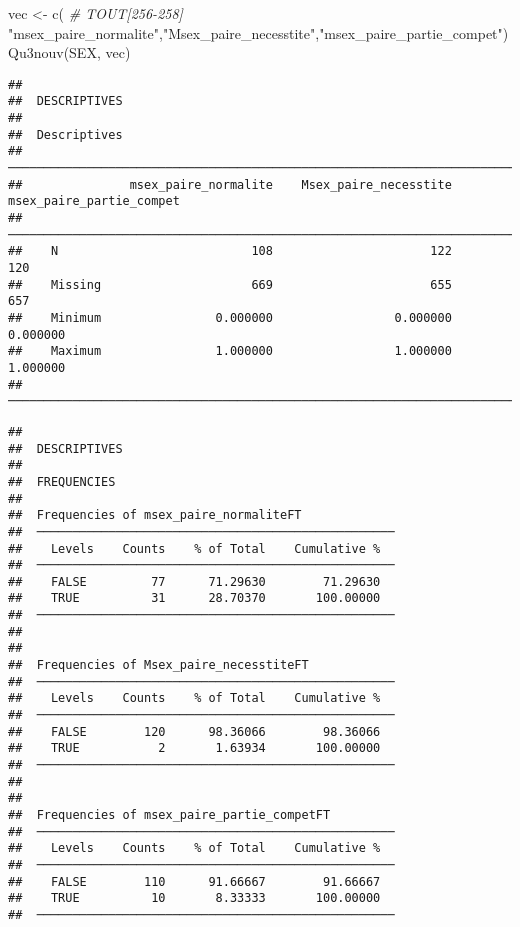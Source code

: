 \documentclass[
]{article}
\newenvironment{Shaded}{\begin{snugshade}}{\end{snugshade}}
\newcommand{\CommentTok}[1]{\textcolor[rgb]{0.56,0.35,0.01}{\textit{#1}}}
\newcommand{\FunctionTok}[1]{\textcolor[rgb]{0.00,0.00,0.00}{#1}}
\newcommand{\NormalTok}[1]{#1}
\newcommand{\OtherTok}[1]{\textcolor[rgb]{0.56,0.35,0.01}{#1}}
\newcommand{\StringTok}[1]{\textcolor[rgb]{0.31,0.60,0.02}{#1}}
\begin{document}
\begin{Shaded}
\begin{Highlighting}[]
\NormalTok{vec }\OtherTok{\textless{}{-}} \FunctionTok{c}\NormalTok{(   }\CommentTok{\# TOUT[256{-}258]}
  \StringTok{"msex\_paire\_normalite"}\NormalTok{,}\StringTok{"Msex\_paire\_necesstite"}\NormalTok{,}\StringTok{"msex\_paire\_partie\_compet"}\NormalTok{)}
\FunctionTok{Qu3nouv}\NormalTok{(SEX, vec)}
\end{Highlighting}
\end{Shaded}

\begin{verbatim}
## 
##  DESCRIPTIVES
## 
##  Descriptives                                                                             
##  ──────────────────────────────────────────────────────────────────────────────────────── 
##               msex_paire_normalite    Msex_paire_necesstite    msex_paire_partie_compet   
##  ──────────────────────────────────────────────────────────────────────────────────────── 
##    N                           108                      122                         120   
##    Missing                     669                      655                         657   
##    Minimum                0.000000                 0.000000                    0.000000   
##    Maximum                1.000000                 1.000000                    1.000000   
##  ────────────────────────────────────────────────────────────────────────────────────────
\end{verbatim}

\begin{verbatim}
## 
##  DESCRIPTIVES
## 
##  FREQUENCIES
## 
##  Frequencies of msex_paire_normaliteFT              
##  ────────────────────────────────────────────────── 
##    Levels    Counts    % of Total    Cumulative %   
##  ────────────────────────────────────────────────── 
##    FALSE         77      71.29630        71.29630   
##    TRUE          31      28.70370       100.00000   
##  ────────────────────────────────────────────────── 
## 
## 
##  Frequencies of Msex_paire_necesstiteFT             
##  ────────────────────────────────────────────────── 
##    Levels    Counts    % of Total    Cumulative %   
##  ────────────────────────────────────────────────── 
##    FALSE        120      98.36066        98.36066   
##    TRUE           2       1.63934       100.00000   
##  ────────────────────────────────────────────────── 
## 
## 
##  Frequencies of msex_paire_partie_competFT          
##  ────────────────────────────────────────────────── 
##    Levels    Counts    % of Total    Cumulative %   
##  ────────────────────────────────────────────────── 
##    FALSE        110      91.66667        91.66667   
##    TRUE          10       8.33333       100.00000   
##  ──────────────────────────────────────────────────
\end{verbatim}
\end{document}

